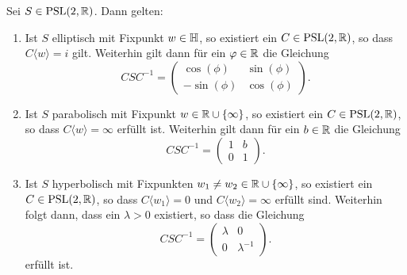 \begin{lemma}
  \label{lemma:psl-trafo}
  Sei $S \in \operatorname{PSL}(2, \mathbb{R})$. Dann gelten:
  \begin{enumerate}
  \item Ist $S$ elliptisch mit Fixpunkt $w \in \mathbb{H}$, so existiert ein $C \in \operatorname{PSL}(2, \mathbb{R})$, so
    dass $C\langle w \rangle = i$ gilt. Weiterhin gilt dann für ein
    $\varphi \in \mathbb{R}$ die Gleichung
    \[
    C S C^{-1} =
    \begin{pmatrix}
      \cos(\phi) & \sin(\phi) \\
      -\sin(\phi) & \cos(\phi)
    \end{pmatrix}.
    \]
  \item Ist $S$ parabolisch mit Fixpunkt $w \in \mathbb{R} \cup \{\infty\}$,
    so existiert ein $C \in \operatorname{PSL}(2, \mathbb{R})$, so dass $C\langle w\rangle =
    \infty$ erfüllt ist. Weiterhin gilt dann für ein $b \in \mathbb{R}$ die Gleichung
    \[
    C S C^{-1} =
    \begin{pmatrix}
      1 & b\\
      0 & 1
    \end{pmatrix}.
    \]
  \item Ist $S$ hyperbolisch mit Fixpunkten $w_1 \neq w_2 \in \mathbb{R} \cup
    \{\infty\}$, so existiert ein $C \in \operatorname{PSL}(2, \mathbb{R})$, so dass $C\langle
    w_1 \rangle = 0$ und $C\langle w_2 \rangle = \infty$ erfüllt
    sind. Weiterhin folgt dann, dass ein $\lambda > 0$ existiert, so dass
    die Gleichung
    \[
    C S C^{-1} = 
    \begin{pmatrix}
      \lambda & 0\\
      0 & \lambda^{-1}
    \end{pmatrix}.
    \]
    erfüllt ist.
  \end{enumerate}
\end{lemma}

